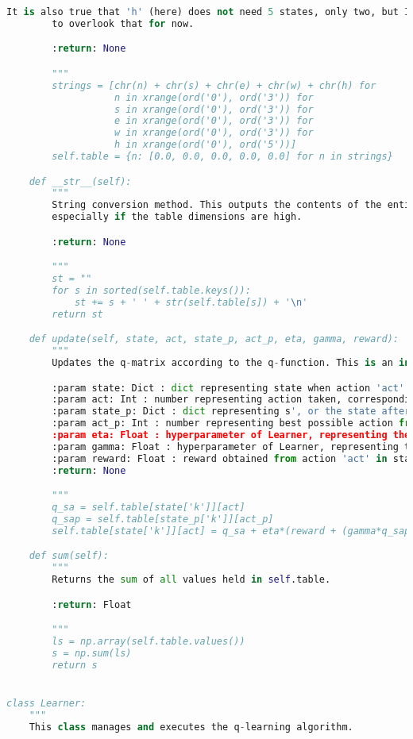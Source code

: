 \documentclass[12pt,a4paper]{article}
\begin{document}
\begin{lstlisting}[language=Python,numbers=none,basicstyle=\tiny]
        It is also true that 'h' (here) does not need 5 states, only two, but I am going
        to overlook that for now.

        :return: None

        """
        strings = [chr(n) + chr(s) + chr(e) + chr(w) + chr(h) for
                   n in xrange(ord('0'), ord('3')) for
                   s in xrange(ord('0'), ord('3')) for
                   e in xrange(ord('0'), ord('3')) for
                   w in xrange(ord('0'), ord('3')) for
                   h in xrange(ord('0'), ord('5'))]
        self.table = {n: [0.0, 0.0, 0.0, 0.0, 0.0] for n in strings}

    def __str__(self):
        """
        String conversion method. This outputs the contents of the entire table, so beware,
        especially if the table dimensions are high.

        :return: None

        """
        st = ""
        for s in sorted(self.table.keys()):
            st += s + ' ' + str(self.table[s]) + '\n'
        return st

    def update(self, state, act, state_p, act_p, eta, gamma, reward):
        """
        Updates the q-matrix according to the q-function. This is an in-place update.

        :param state: Dict : dict representing state when action 'act' was taken
        :param act: Int : number representing action taken, corresponding to Board.actToInt()
        :param state_p: Dict : dict representing s', or the state after action 'act was taken.
        :param act_p: Int : number representing best possible action from s'
        :param eta: Float : hyperparameter of Learner, representing the learning rate
        :param gamma: Float : hyperparameter of Learner, representing the "discount"
        :param reward: Float : reward obtained from action 'act' in state 'state'
        :return: None

        """
        q_sa = self.table[state['k']][act]
        q_sap = self.table[state_p['k']][act_p]
        self.table[state['k']][act] = q_sa + eta*(reward + (gamma*q_sap) - q_sa)

    def sum(self):
        """
        Returns the sum of all values held in self.table.

        :return: Float

        """
        ls = np.array(self.table.values())
        s = np.sum(ls)
        return s


class Learner:
    """
    This class manages and executes the q-learning algorithm.


\end{lstlisting}
\end{document}
